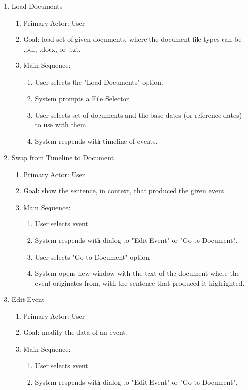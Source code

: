 \begin{enumerate}
  \item Load Documents
  \begin{enumerate}
    \item Primary Actor: User
    \item Goal: load set of given documents, where the document file types can be  .pdf, .docx, or .txt.
    \item Main Sequence:
	\begin{enumerate}
		\item User selects the "Load Documents" option.
		\item System prompts a File Selector.
		\item User selects set of documents and the base dates (or reference dates) to use with them.
		\item System responds with timeline of events.
	\end{enumerate}
  \end{enumerate}
  \item Swap from Timeline to Document
   \begin{enumerate}
	\item Primary Actor: User
	\item Goal: show the sentence, in context, that produced the given event.
	\item Main Sequence:
	\begin{enumerate}
		\item User selects event.
		\item System responds with dialog to "Edit Event" or "Go to Document".
		\item User selects "Go to Document" option.
		\item System opens new window with the text of the document where the event originates from, with the sentence that produced it highlighted.
	\end{enumerate}
    \end{enumerate}
   \item Edit Event
      \begin{enumerate}
	\item Primary Actor: User
	\item Goal: modify the data of an event.
	\item Main Sequence:
	\begin{enumerate}
		\item User selects event.
		\item System responds with dialog to "Edit Event" or "Go to Document".

\end{enumerate}
\end{enumerate}
\end{enumerate}
